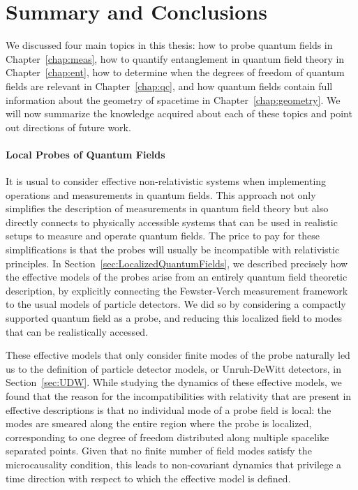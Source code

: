 \documentclass[letterpaper,12pt,titlepage,oneside,final]{book}
\begin{document}
%

\chapter{Summary and Conclusions}\label{chap:conclusions}

We discussed four main topics in this thesis: how to probe quantum fields in Chapter~\ref{chap:meas}, how to quantify entanglement in quantum field theory in Chapter~\ref{chap:ent}, how to determine when the degrees of freedom of quantum fields are relevant in Chapter~\ref{chap:qc}, and how quantum fields contain full information about the geometry of spacetime in Chapter~\ref{chap:geometry}. We will now summarize the knowledge acquired about each of these topics and point out directions of future work.

\subsubsection*{Local Probes of Quantum Fields}

It is usual to consider effective non-relativistic systems when implementing operations and measurements in quantum fields. This approach not only simplifies the description of measurements in quantum field theory but also directly connects to physically accessible systems that can be used in realistic setups to measure and operate quantum fields. The price to pay for these simplifications is that the probes will usually be incompatible with relativistic principles. In Section~\ref{sec:LocalizedQuantumFields}, we described precisely how the effective models of the probes arise from an entirely quantum field theoretic description, by explicitly connecting the Fewster-Verch measurement framework to the usual models of particle detectors. We did so by considering a compactly supported quantum field as a probe, and reducing this localized field to modes that can be realistically accessed. 

These effective models that only consider finite modes of the probe naturally led us to the definition of particle detector models, or Unruh-DeWitt detectors, in Section~\ref{sec:UDW}. While studying the dynamics of these effective models, we found that the reason for the incompatibilities with relativity that are present in effective descriptions is that no individual mode of a probe field is local: the modes are smeared along the entire region where the probe is localized, corresponding to one degree of freedom distributed along multiple spacelike separated points. Given that no finite number of field modes satisfy the microcausality condition, this leads to non-covariant dynamics that privilege a time direction with respect to which the effective model is defined.
\end{document}
